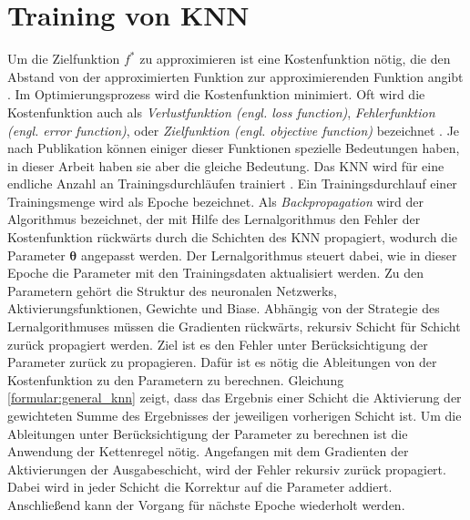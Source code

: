 \section{Training von KNN}
Um die Zielfunktion $f^{*}$ zu approximieren ist eine Kostenfunktion nötig, die den Abstand von der approximierten Funktion zur approximierenden Funktion angibt \cite{nielsenneural}.
Im Optimierungsprozess wird die Kostenfunktion minimiert. 
Oft wird die Kostenfunktion auch als \textit{Verlustfunktion (engl. loss function)}, \textit{Fehlerfunktion (engl. error function)},
oder \textit{Zielfunktion (engl. objective function)} bezeichnet \cite{bengio2017deep}.
Je nach Publikation können einiger dieser Funktionen spezielle Bedeutungen haben, in dieser Arbeit haben sie aber die gleiche Bedeutung.
\newline
\newline
Das KNN wird für eine endliche Anzahl an Trainingsdurchläufen trainiert \cite{nielsenneural}.
Ein Trainingsdurchlauf einer Trainingsmenge wird als Epoche bezeichnet.
Als \textit{Backpropagation} wird der Algorithmus bezeichnet, der mit Hilfe des Lernalgorithmus den Fehler der
Kostenfunktion rückwärts durch die Schichten des KNN propagiert, wodurch die Parameter $\boldsymbol\theta$ angepasst werden.
Der Lernalgorithmus steuert dabei, wie in dieser Epoche die Parameter mit den Trainingsdaten aktualisiert werden.
Zu den Parametern gehört die Struktur des neuronalen Netzwerks, Aktivierungsfunktionen, Gewichte und Biase.
\newline
\newline
Abhängig von der Strategie des Lernalgorithmuses müssen die Gradienten rückwärts, rekursiv Schicht für Schicht zurück propagiert werden.
Ziel ist es den Fehler unter Berücksichtigung der Parameter zurück zu propagieren.
Dafür ist es nötig die Ableitungen von der Kostenfunktion zu den Parametern zu berechnen.
Gleichung \ref{formular:general_knn} zeigt, dass das Ergebnis einer Schicht die Aktivierung der gewichteten Summe des
Ergebnisses der jeweiligen vorherigen Schicht ist.
Um die Ableitungen unter Berücksichtigung der Parameter zu berechnen ist die Anwendung der Kettenregel nötig.
\newline
\newline
Angefangen mit dem Gradienten der Aktivierungen der Ausgabeschicht, wird der Fehler rekursiv zurück propagiert.
Dabei wird in jeder Schicht die Korrektur auf die Parameter addiert.
Anschließend kann der Vorgang für nächste Epoche wiederholt werden.